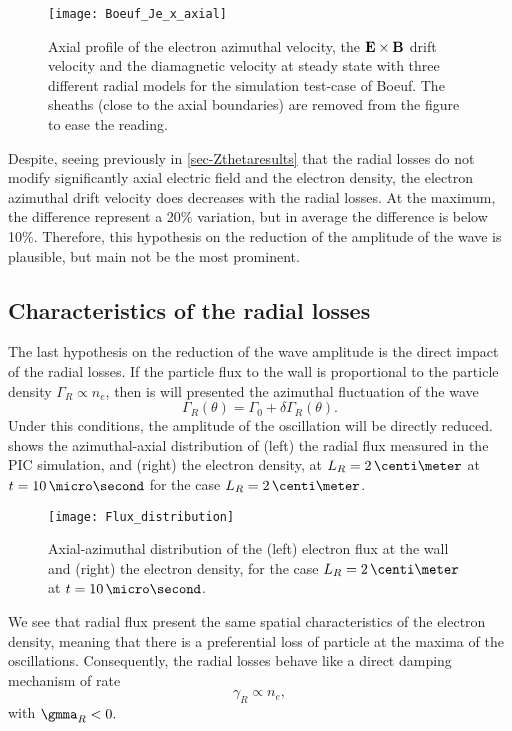    
  \begin{figure}[hbt]
    \centering
    \texttt{[image: Boeuf\_Je\_x\_axial]}
    \caption{Axial profile of the electron azimuthal velocity, the ${\mathbf E} \times {\mathbf B}$ drift velocity and the diamagnetic velocity at steady state with three different radial models for the simulation test-case of Boeuf. The sheaths (close to the axial boundaries) are removed from the figure to ease the reading.}
    \label{fig-Jetheta}
  \end{figure}

  Despite, seeing previously in \cref{sec-Zthetaresults} that the radial losses do not modify significantly axial electric field and the electron density, the electron azimuthal drift velocity does decreases with the radial losses. 
  At the maximum, the difference represent a 20\% variation, but in average the difference is below 10\%.
  Therefore, this hypothesis on the reduction of the amplitude of the wave is plausible, but main not be the most prominent.



\FloatBarrier


\subsection{Characteristics of the radial losses}

The last hypothesis on the reduction of the wave amplitude is the direct impact of the radial losses.
If the particle flux to the wall is proportional to the particle density $\Gamma_R \propto n_e$, then is will presented the azimuthal fluctuation of the wave
\[ \Gamma_R(\theta) = \Gamma_0 + \delta \Gamma_R(\theta). \]
Under this conditions, the amplitude of the oscillation will be directly reduced.
 shows the azimuthal-axial distribution of (left) the radial flux measured in the \ac{PIC} simulation, and (right) the electron density, at $L_R=2\,\centi\meter$ at $t=10\,\micro\second$ for the case $L_R=2\,\centi\meter$.

\begin{figure}[hbtp]
  \centering
  \texttt{[image: Flux\_distribution]}
  \caption{Axial-azimuthal distribution of the (left) electron flux at the wall and (right) the electron density, for the case $L_R=2\,\centi\meter$ at $t=10\,\micro\second$.}
  \label{fig-rfluxs}
\end{figure}

We see that radial flux present the same spatial characteristics of the electron density, meaning that there is a preferential loss of particle at the maxima of the oscillations.
Consequently, the radial losses behave like a direct damping mechanism of rate 
\[  \gamma_R \propto n_e, \]
with $\gmma_R < 0.$

